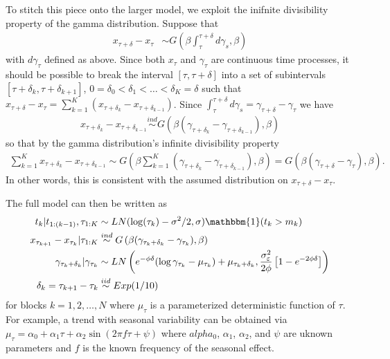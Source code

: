 \documentclass{article}
\begin{document}
To stitch this piece onto the larger model, we exploit the inifnite divisibility property of the gamma distribution. Suppose that
\begin{align*}
x_{\tau + \delta} - x_\tau &\sim G(\beta \int_{\tau}^{\tau + \delta} d\gamma_s, \beta)
\end{align*}
with $d\gamma_\tau$ defined as above. Since both $x_{\tau}$ and $\gamma_{\tau}$ are continuous time processes, it should be possible to break the interval $[\tau, \tau + \delta]$ into a set of subintervals $[\tau + \delta_k, \tau + \delta_{k+1}]$, $0=\delta_0<\delta_1<\dots<\delta_K=\delta$ such that $x_{\tau + \delta} - x_{\tau} = \sum_{k=1}^K (x_{\tau + \delta_k} - x_{\tau + \delta_{k-1}})$. Since $\int_{\tau}^{\tau + \delta}d\gamma_s = \gamma_{\tau + \delta} - \gamma_{\tau}$ we have 
\begin{align*}
x_{\tau + \delta_k} - x_{\tau + \delta_{k-1}} \stackrel{ind}{\sim} G(\beta(\gamma_{\tau + \delta_k} - \gamma_{\tau + \delta_{k-1}}), \beta)
\end{align*}
so that by the gamma distribution's infinite divisibility property
\begin{align*}
\sum_{k=1}^Kx_{\tau + \delta_k} - x_{\tau + \delta_{k-1}} \sim G\left(\beta\sum_{k=1}^K(\gamma_{\tau + \delta_k} - \gamma_{\tau + \delta_{k-1}}), \beta\right) = G\left(\beta(\gamma_{\tau + \delta} - \gamma_\tau), \beta\right).
\end{align*}
In other words, this is consistent with the assumed distribution on $x_{\tau + \delta} - x_{\tau}$.

The full model can then be written as
\begin{align*}
t_k|t_{1:(k-1)}, \tau_{1:K} &\sim LN(\log(\tau_k) - \sigma^2/2, \sigma)\mathbbm{1}(t_k > m_k)\\
x_{\tau_{k+1}} - x_{\tau_{k}}|\tau_{1:K} & \stackrel{ind}{\sim} G\left(\beta(\gamma_{\tau_k + \delta_k} - \gamma_{\tau_k}),\beta\right)\\
\gamma_{\tau_k + \delta_k}|\gamma_{\tau_k} & \sim LN\left(e^{-\phi\delta}(\log\gamma_{\tau_k} - \mu_{\tau_k}) + \mu_{\tau_k + \delta_k}, \frac{\sigma_{\varepsilon}^2}{2\phi}\left[1 - e^{-2\phi\delta}\right]\right)\\
\delta_{k} = \tau_{k+1} - \tau_{k} &\stackrel{iid}{\sim} Exp(1/10)
\end{align*}
for blocks $k=1,2,\dots,N$ where $\mu_{\tau}$ is a parameterized deterministic function of $\tau$. For example, a trend with seasonal variability can be obtained via $\mu_{\tau} = \alpha_0 + \alpha_1\tau + \alpha_2\sin(2\pi f \tau + \psi)$ where $alpha_{0}$, $\alpha_1$, $\alpha_2$, and $\psi$ are uknown parameters and $f$ is the known frequency of the seasonal effect.
\end{document}
